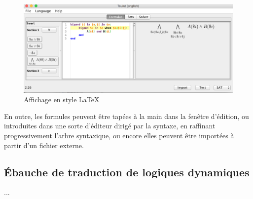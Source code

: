 \begin{figure}[htbp]
\centering
\includegraphics[scale=0.45]{figures/LatexDisplay.png}
  \caption{Affichage en style \LaTeX}
  \label{fig:LatexDisplay}
\end{figure}


En outre, les formules peuvent être tapées à la main dans la fenêtre d'édition, ou introduites dans une sorte d'éditeur dirigé par la syntaxe, en raffinant progressivement l'arbre syntaxique, ou encore elles peuvent être importées à partir d'un fichier externe.







\subsection{Ébauche de traduction de logiques dynamiques}
...
